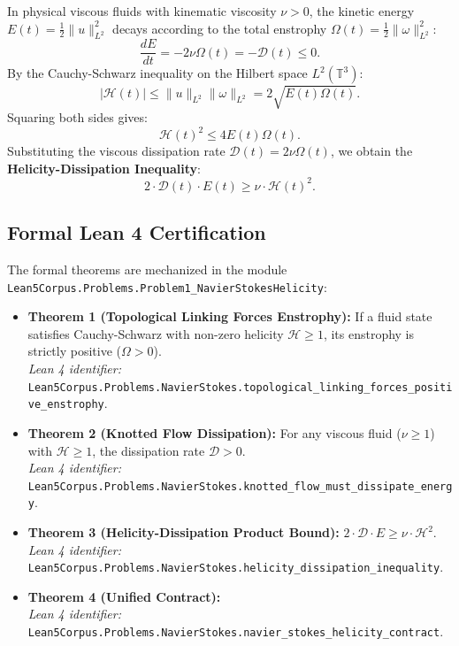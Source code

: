 \documentclass[11pt,a4paper]{article}
\begin{document}
In physical viscous fluids with kinematic viscosity $\nu > 0$, the kinetic energy $E(t) = \frac{1}{2} \|u\|_{L^2}^2$ decays according to the total enstrophy $\Omega(t) = \frac{1}{2} \|\omega\|_{L^2}^2$:
\begin{equation}
    \frac{dE}{dt} = -2\nu \Omega(t) = -\mathcal{D}(t) \le 0.
\end{equation}
By the Cauchy-Schwarz inequality on the Hilbert space $L^2(\mathbb{T}^3)$:
\begin{equation}
    |\mathcal{H}(t)| \le \|u\|_{L^2} \|\omega\|_{L^2} = 2 \sqrt{E(t) \Omega(t)}.
\end{equation}
Squaring both sides gives:
\begin{equation}
    \mathcal{H}(t)^2 \le 4 E(t) \Omega(t).
\end{equation}
Substituting the viscous dissipation rate $\mathcal{D}(t) = 2\nu \Omega(t)$, we obtain the \textbf{Helicity-Dissipation Inequality}:
\begin{equation}
    2 \cdot \mathcal{D}(t) \cdot E(t) \ge \nu \cdot \mathcal{H}(t)^2.
\end{equation}

\subsection{Formal Lean 4 Certification}
The formal theorems are mechanized in the module \texttt{Lean5Corpus.Problems.Problem1\_NavierStokesHelicity}:
\begin{itemize}
    \item \textbf{Theorem 1 (Topological Linking Forces Enstrophy):} If a fluid state satisfies Cauchy-Schwarz with non-zero helicity $\mathcal{H} \ge 1$, its enstrophy is strictly positive ($\Omega > 0$). \\
    \textit{Lean 4 identifier:} \texttt{Lean5Corpus.Problems.NavierStokes.topological\_linking\_forces\_positive\_enstrophy}.
    \item \textbf{Theorem 2 (Knotted Flow Dissipation):} For any viscous fluid ($\nu \ge 1$) with $\mathcal{H} \ge 1$, the dissipation rate $\mathcal{D} > 0$. \\
    \textit{Lean 4 identifier:} \texttt{Lean5Corpus.Problems.NavierStokes.knotted\_flow\_must\_dissipate\_energy}.
    \item \textbf{Theorem 3 (Helicity-Dissipation Product Bound):} $2 \cdot \mathcal{D} \cdot E \ge \nu \cdot \mathcal{H}^2$. \\
    \textit{Lean 4 identifier:} \texttt{Lean5Corpus.Problems.NavierStokes.helicity\_dissipation\_inequality}.
    \item \textbf{Theorem 4 (Unified Contract):} \\
    \textit{Lean 4 identifier:} \texttt{Lean5Corpus.Problems.NavierStokes.navier\_stokes\_helicity\_contract}.
\end{itemize}
\end{document}
